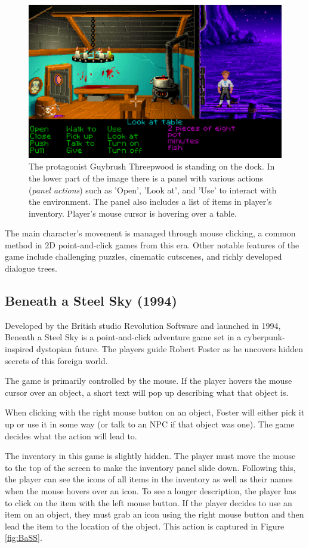 \begin{figure}[H]
\centering
\includegraphics[width=1.\linewidth]{img/TSoMI.png}
\caption{The protagonist Guybrush Threepwood is standing on the dock. In the lower part of the image there is a panel with various actions (\textit{panel actions}) such as 'Open', 'Look at', and 'Use' to interact with the environment. The  panel also includes a list of items in player's inventory. Player's mouse cursor is hovering over a table.}
\label{fig:TSoMI}
\end{figure}
The main character's movement is managed through mouse clicking, a common method in 2D point-and-click games from this era. Other notable features of the game include challenging puzzles, cinematic cutscenes, and richly developed dialogue trees.

\subsection{Beneath a Steel Sky (1994)}
Developed by the British studio Revolution Software and launched in 1994, Beneath a Steel Sky is a point-and-click adventure game set in a cyberpunk-inspired dystopian future. The players guide Robert Foster as he uncovers hidden secrets of this foreign world.

The game is primarily controlled by the mouse. If the player hovers the mouse cursor over an object, a short text will pop up describing what that object is.

When clicking with the right mouse button on an object, Foster will either pick it up or use it in some way (or talk to an NPC if that object was one). The game decides what the action will lead to.

The inventory in this game is slightly hidden. The player must move the mouse to the top of the screen to make the inventory panel slide down. Following this, the player can see the icons of all items in the inventory as well as their names when the mouse hovers over an icon. To see a longer description, the player has to click on the item with the left mouse button. If the player decides to use an item on an object, they must grab an icon using the right mouse button and then lead the item to the location of the object. This action is captured in Figure \ref{fig:BaSS}.


